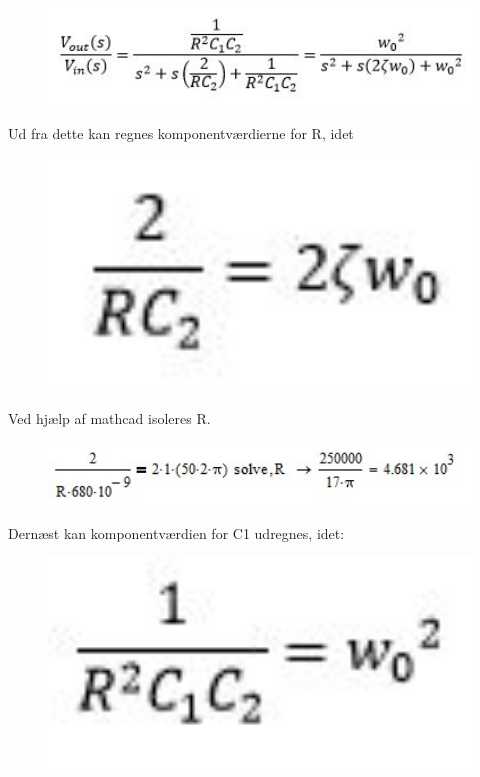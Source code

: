 \begin{figure}[h]
	\centering
	\includegraphics[width=1\textwidth]{Figurer/ligning3}
	\label{fig:lign3}
\end{figure}

Ud fra dette kan regnes komponentværdierne for R, idet

\begin{figure}[h]
	\centering
	\includegraphics[width=1\textwidth]{Figurer/ligning4}
	\label{fig:lign4}
\end{figure}

Ved hjælp af mathcad isoleres R.

\begin{figure}[h]
	\centering
	\includegraphics[width=1\textwidth]{Figurer/ligning5}
	\label{fig:lign5}
\end{figure}

Dernæst kan komponentværdien for C1 udregnes, idet:

\begin{figure}[h]
	\centering
	\includegraphics[width=1\textwidth]{Figurer/ligning6}
	\label{fig:lign6}
\end{figure}

